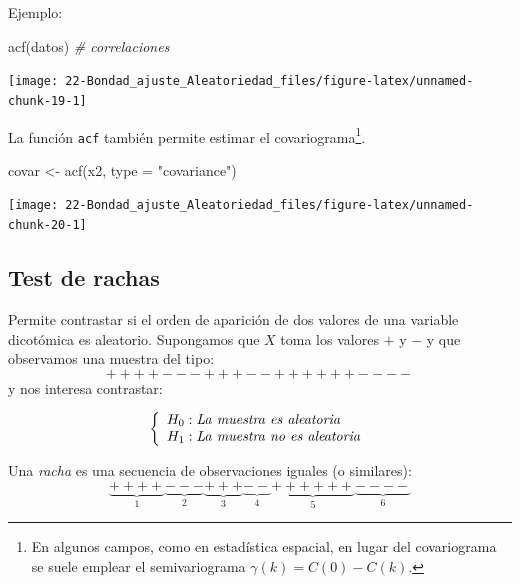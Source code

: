 \documentclass[
]{book}
\newenvironment{Shaded}{\begin{snugshade}}{\end{snugshade}}
\newcommand{\AttributeTok}[1]{\textcolor[rgb]{0.77,0.63,0.00}{#1}}
\newcommand{\CommentTok}[1]{\textcolor[rgb]{0.56,0.35,0.01}{\textit{#1}}}
\newcommand{\FunctionTok}[1]{\textcolor[rgb]{0.00,0.00,0.00}{#1}}
\newcommand{\NormalTok}[1]{#1}
\newcommand{\OtherTok}[1]{\textcolor[rgb]{0.56,0.35,0.01}{#1}}
\newcommand{\StringTok}[1]{\textcolor[rgb]{0.31,0.60,0.02}{#1}}
\theoremstyle{break}
\theoremstyle{nonumberplain}
\begin{document}
Ejemplo:

\begin{Shaded}
\begin{Highlighting}[]
\FunctionTok{acf}\NormalTok{(datos)  }\CommentTok{\# correlaciones}
\end{Highlighting}
\end{Shaded}

\begin{center}\texttt{[image: 22-Bondad\_ajuste\_Aleatoriedad\_files/figure-latex/unnamed-chunk-19-1]} \end{center}

La función \texttt{acf} también permite estimar el covariograma\footnote{En algunos campos, como en estadística espacial, en lugar del covariograma se suele emplear el semivariograma \(\gamma(k) = C(0) - C(k)\).}.

\begin{Shaded}
\begin{Highlighting}[]
\NormalTok{covar }\OtherTok{\textless{}{-}} \FunctionTok{acf}\NormalTok{(x2, }\AttributeTok{type =} \StringTok{"covariance"}\NormalTok{)}
\end{Highlighting}
\end{Shaded}

\begin{center}\texttt{[image: 22-Bondad\_ajuste\_Aleatoriedad\_files/figure-latex/unnamed-chunk-20-1]} \end{center}

\hypertarget{test-de-rachas}{%
\subsection{Test de rachas}\label{test-de-rachas}}

Permite contrastar si el orden de aparición de dos valores de una
variable dicotómica es aleatorio.
Supongamos que \(X\) toma los valores \(+\) y \(-\)
y que observamos una muestra del tipo:
\[++++---+++--++++++----\]
y nos interesa contrastar:

\[\left\{ \begin{array}[c]{l}
    H_{0}:\mathit{La\ muestra\ es\ aleatoria}\\
    H_{1}:\mathit{La\ muestra\ no\ es\ aleatoria}
\end{array}
\right.\]

Una \emph{racha} es una secuencia de observaciones iguales (o
similares):
\[\underbrace{++++}_{1}\underbrace{---}_{2}\underbrace{+++}_{3}
\underbrace{--}_{4}\underbrace{++++++}_{5}\underbrace{----}_{6}\]
\end{document}
